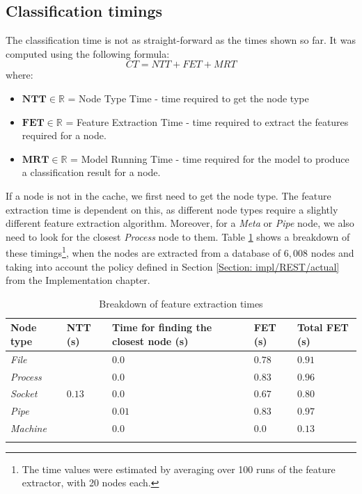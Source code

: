 		\subsection{Classification timings} \label{Section: eval/service-time/classification}
			The classification time is not as straight-forward as the times shown so far. It was computed using the following formula:
			\begin{equation}
				CT = NTT + FET + MRT
			\end{equation}
			where: 
			\begin{itemize}
				\item $\mathbf{NTT} \in \mathbb{R}$ = Node Type Time - time required to get the node type
				\item $\mathbf{FET} \in \mathbb{R}$ = Feature Extraction Time - time required to extract the features required for a node.
				\item $\mathbf{MRT} \in \mathbb{R}$ = Model Running Time - time required for the model to produce a classification result for a node.
			\end{itemize}
			If a node is not in the cache, we first need to get the node type. The feature extraction time is dependent on this, as different node types require a slightly different feature extraction algorithm. Moreover, for a \textit{Meta} or \textit{Pipe} node, we also need to look for the closest \textit{Process} node to them. Table \ref{Table: eval/service-time/classification/fet} shows a breakdown of these timings\footnote{The time values were estimated by averaging over 100 runs of the feature extractor, with 20 nodes each.}, when the nodes are extracted from a database of $6,008$ nodes and taking into account the policy defined in Section \ref{Section: impl/REST/actual} from the Implementation chapter.
			\begin{longtable}{|p{} || p{} | p{}| p{}| p{} | }
				\textbf{Node type} & \textbf{NTT} (s) & \textbf{Time for finding the closest node} (s)& \textbf{FET} (s)& \textbf{Total FET} (s)\\
				\hline
				\textit{File} & \multirow{5}{*}{$0.13$}& $0.0$ & $0.78$& $\mathbf{0.91}$ \\
				\hhline{-~---}
				\textit{Process} & & $0.0$ & $0.83$ & $\mathbf{0.96}$\\
				\hhline{-~---}
				\textit{Socket} & & $0.0$ & $0.67$ & $\mathbf{0.80}$ \\
				\hhline{-~---}
				\textit{Pipe} & & $0.01$ & $0.83$ & $\mathbf{0.97}$ \\
				\hhline{-~---}
				\textit{Machine} & & $0.0$ & $0.0$ & $\mathbf{0.13}$\\
				\hline
				\caption{Breakdown of feature extraction times}
				\label{Table: eval/service-time/classification/fet}
			\end{longtable}
			
